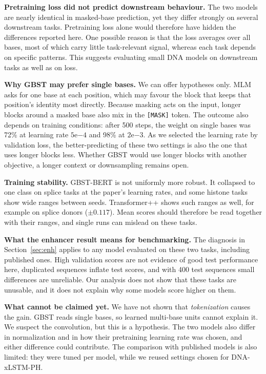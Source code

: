 \documentclass{article}
\begin{document}
\textbf{Pretraining loss did not predict downstream behaviour.} The two models are nearly identical in
masked-base prediction, yet they differ strongly on several downstream tasks. Pretraining loss alone
would therefore have hidden the differences reported here. One possible reason is that the loss
averages over all bases, most of which carry little task-relevant signal, whereas each task depends on
specific patterns. This suggests evaluating small DNA models on downstream tasks as well as on loss.

\textbf{Why GBST may prefer single bases.} We can offer hypotheses only. MLM asks for one base at each
position, which may favour the block that keeps that position's identity most directly. Because masking
acts on the input, longer blocks around a masked base also mix in the \texttt{[MASK]} token. The outcome
also depends on training conditions: after 500 steps, the weight on single bases was 72\% at learning
rate $5\mathrm{e}{-4}$ and 98\% at $2\mathrm{e}{-3}$. As we selected the learning rate by validation
loss, the better-predicting of these two settings is also the one that uses longer blocks less. Whether GBST
would use longer blocks with another objective, a longer context or downsampling remains open.

\textbf{Training stability.} GBST-BERT is not uniformly more robust. It collapsed to one class on splice
tasks at the paper's learning rates, and some histone tasks show wide ranges between seeds. Transformer++
shows such ranges as well, for example on splice donors ($\pm0.117$). Mean scores should therefore be
read together with their ranges, and single runs can mislead on these tasks.

\textbf{What the enhancer result means for benchmarking.} The diagnosis in Section~\ref{sec:enh} applies
to any model evaluated on these two tasks, including published ones. High validation scores are not
evidence of good test performance here, duplicated sequences inflate test scores, and with 400 test
sequences small differences are unreliable. Our analysis does not show that these tasks are unusable,
and it does not explain why some models score higher on them.

\textbf{What cannot be claimed yet.} We have not shown that \emph{tokenization} causes the gain. GBST
reads single bases, so learned multi-base units cannot explain it. We suspect the convolution, but this
is a hypothesis. The two models also differ in normalization and in how their pretraining learning rate
was chosen, and either difference could contribute. The comparison with published models is also
limited: they were tuned per model, while we reused settings chosen for DNA-xLSTM-PH.
\end{document}
